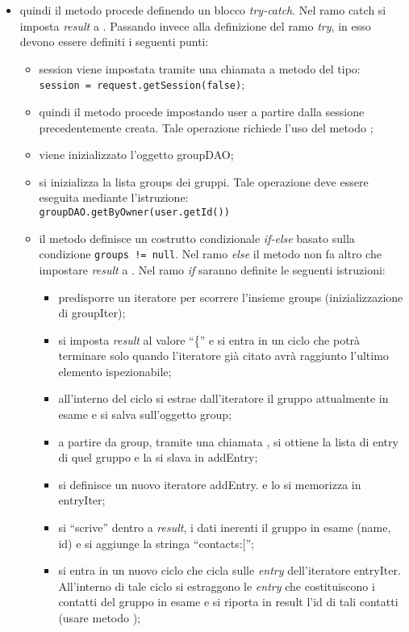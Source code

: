 \begin{description}
\begin{itemize}
		\item quindi il metodo procede definendo un blocco \textit{try-catch}. Nel ramo catch si imposta \textit{result} a . Passando invece alla definizione del ramo \textit{try}, in esso devono essere definiti i seguenti punti:
		\begin{itemize}
			\item session viene impostata tramite una chiamata a metodo del tipo:\\
			\verb|session = request.getSession(false)|;
			\item quindi il metodo procede impostando user a partire dalla sessione precedentemente creata. Tale operazione richiede l'uso del metodo ;
			\item viene inizializzato l'oggetto groupDAO;
			\item si inizializza la lista groups dei gruppi. Tale operazione deve essere eseguita mediante l'istruzione:\\
			\verb|groupDAO.getByOwner(user.getId())|
			\item il metodo definisce un costrutto condizionale \textit{if-else} basato sulla condizione \texttt{groups != null}. Nel ramo \textit{else} il metodo non fa altro che impostare \textit{result} a . Nel ramo \textit{if} saranno definite le seguenti istruzioni:	
			\begin{itemize}
				\item predisporre un iteratore per scorrere l'insieme groups (inizializzazione di groupIter);
				\item si imposta \textit{result} al valore ``\{'' e si entra in un ciclo  che potrà terminare solo quando l'iteratore già citato avrà raggiunto l'ultimo elemento ispezionabile;
				\item all'interno del ciclo si estrae dall'iteratore il gruppo attualmente in esame e si salva sull'oggetto group;
				\item a partire da group, tramite una chiamata , si ottiene la lista di entry di quel gruppo e la si slava in addEntry;
				\item si definisce un nuovo iteratore addEntry. e lo si memorizza in entryIter;
				\item si ``scrive'' dentro a \textit{result}, i dati inerenti il gruppo in esame (name, id) e si aggiunge la stringa ``contacts:['';
				\item si entra in un nuovo ciclo  che cicla sulle \textit{entry} dell'iteratore entryIter. All'interno di tale ciclo si estraggono le \textit{entry} che costituiscono i contatti del gruppo in esame e si riporta in result l'id di tali contatti (usare metodo );

\end{itemize}
\end{itemize}
\end{itemize}
\end{description}
